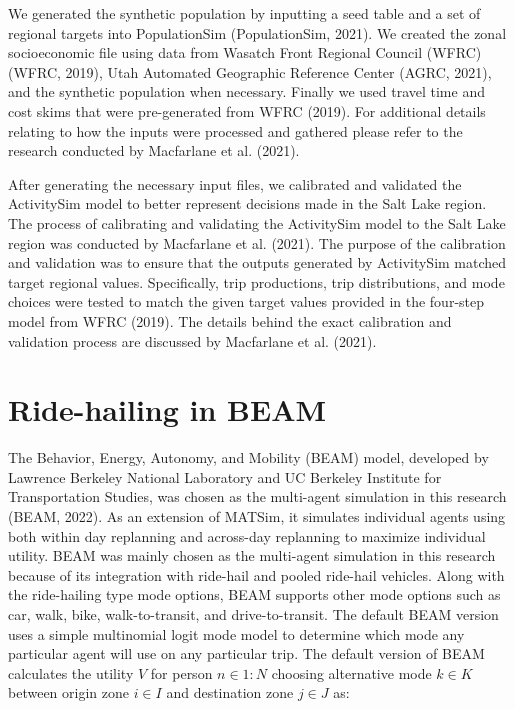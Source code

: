 \documentclass[simple, masters, twoside]{byuthesis}
\begin{document}
We generated the synthetic population by inputting a seed table and a set of regional targets into PopulationSim (PopulationSim, 2021). We created the zonal socioeconomic file using data from Wasatch Front Regional Council (WFRC) (WFRC, 2019), Utah Automated Geographic Reference Center (AGRC, 2021), and the synthetic population when necessary. Finally we used travel time and cost skims that were pre-generated from WFRC (2019). For additional details relating to how the inputs were processed and gathered please refer to the research conducted by Macfarlane et al. (2021).

After generating the necessary input files, we calibrated and validated the ActivitySim model to better represent decisions made in the Salt Lake region. The process of calibrating and validating the ActivitySim model to the Salt Lake region was conducted by Macfarlane et al. (2021). The purpose of the calibration and validation was to ensure that the outputs generated by ActivitySim matched target regional values. Specifically, trip productions, trip distributions, and mode choices were tested to match the given target values provided in the four-step model from WFRC (2019). The details behind the exact calibration and validation process are discussed by Macfarlane et al. (2021).

\hypertarget{novel-beam}{%
\section{Ride-hailing in BEAM}\label{novel-beam}}

The Behavior, Energy, Autonomy, and Mobility (BEAM) model, developed by Lawrence Berkeley National Laboratory and UC Berkeley Institute for Transportation Studies, was chosen as the multi-agent simulation in this research (BEAM, 2022). As an extension of MATSim, it simulates individual agents using both within day replanning and across-day replanning to maximize individual utility. BEAM was mainly chosen as the multi-agent simulation in this research because of its integration with ride-hail and pooled ride-hail vehicles. Along with the ride-hailing type mode options, BEAM supports other mode options such as car, walk, bike, walk-to-transit, and drive-to-transit. The default BEAM version uses a simple multinomial logit mode model to determine which mode any particular agent will use on any particular trip. The default version of BEAM calculates the utility \(V\) for person \(n \in {1:N}\) choosing alternative mode \(k \in K\) between origin zone \(i \in I\) and destination zone \(j \in J\) as:
\end{document}
